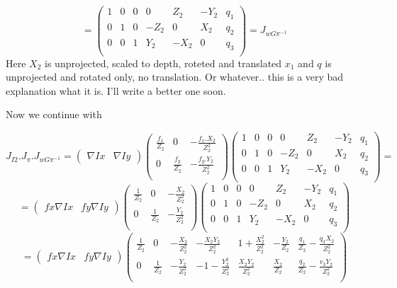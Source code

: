 \documentclass[a4paper,12pt]{article}
\begin{document}
\[
= \begin{pmatrix}
1 & 0 & 0 & 0 & Z_2 & -Y_2 & q_1 \\
0 & 1 & 0 & -Z_2 & 0 & X_2 & q_2 \\
0 & 0 & 1 & Y_2 & -X_2 & 0 & q_3 \\
\end{pmatrix} = J_{wG\pi^{-1}}
\]
Here $X_2$ is unprojected, scaled to depth, roteted and translated $x_1$ and $q$ is unprojected and rotated only, no translation. Or whatever.. this is a very bad explanation what it is. I'll write a better one soon.
\par Now we continue with

\[
J_{I2}.J_{\pi}.J_{wG\pi^{-1}} =
\begin{pmatrix}
\nabla Ix &
\nabla Iy
\end{pmatrix} 
\begin{pmatrix}
\frac{f_x}{Z_2} & 0 & -\frac{f_x.X_2}{Z^2_{2}} \\
0 & \frac{f_y}{Z_2} & -\frac{f_y.Y_2}{Z^2_{2}} \\
\end{pmatrix} 
\begin{pmatrix}
1 & 0 & 0 & 0 & Z_2 & -Y_2 & q_1 \\
0 & 1 & 0 & -Z_2 & 0 & X_2 & q_2 \\
0 & 0 & 1 & Y_2 & -X_2 & 0 & q_3 \\
\end{pmatrix} =
\]
\[
= \begin{pmatrix}
fx \nabla Ix &
fy \nabla Iy
\end{pmatrix} 
\begin{pmatrix}
\frac{1}{Z_2} & 0 & -\frac{X_2}{Z^2_{2}} \\
0 & \frac{1}{Z_2} & -\frac{Y_2}{Z^2_{2}} \\
\end{pmatrix} 
\begin{pmatrix}
1 & 0 & 0 & 0 & Z_2 & -Y_2 & q_1 \\
0 & 1 & 0 & -Z_2 & 0 & X_2 & q_2 \\
0 & 0 & 1 & Y_2 & -X_2 & 0 & q_3 \\
\end{pmatrix} 
\]
\[
= \begin{pmatrix}
fx \nabla Ix &
fy \nabla Iy
\end{pmatrix} 
\begin{pmatrix}
\frac{1}{Z_2} & 0 & -\frac{X_2}{Z_2^2} & -\frac{X_2 Y_2}{Z_2^2} & 1+\frac{X_2^2}{Z_2^2} & -\frac{Y_2}{Z_2} & \frac{q_1}{Z_2} - \frac{q_3 X_2}{Z_2^2}\\
0 & \frac{1}{Z_2} & -\frac{Y_2}{Z_2^2} & -1-\frac{Y_2^2}{Z_2^2} & \frac{X_2 Y_2}{Z_2^2} & \frac{X_2}{Z_2} & \frac{q_2}{Z_2} - \frac{v_3 Y_2}{Z_2^2} \\

\end{pmatrix} 
\]
\end{document}
